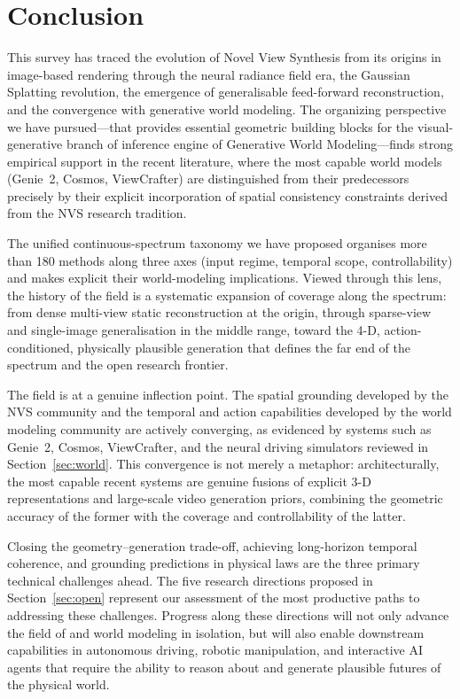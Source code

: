 \section{Conclusion}
\label{sec:conclusion}

This survey has traced the evolution of Novel View Synthesis from its origins
in image-based rendering through the neural radiance field era, the Gaussian
Splatting revolution, the emergence of generalisable feed-forward reconstruction,
and the convergence with generative world modeling.
The organizing perspective we have pursued---that \nvs{} provides essential geometric building blocks for the visual-generative branch of
inference engine of Generative World Modeling---finds strong empirical support
in the recent literature, where the most capable world models (Genie~2,
Cosmos, ViewCrafter) are distinguished from their predecessors precisely by
their explicit incorporation of spatial consistency constraints derived from
the NVS research tradition.

The unified continuous-spectrum taxonomy we have proposed organises more than
180 methods along three axes (input regime, temporal scope, controllability)
and makes explicit their world-modeling implications.
Viewed through this lens, the history of the field is a systematic expansion
of coverage along the spectrum: from dense multi-view static reconstruction
at the origin, through sparse-view and single-image generalisation in the
middle range, toward the 4-D, action-conditioned, physically plausible
generation that defines the far end of the spectrum and the open research frontier.

The field is at a genuine inflection point.
The spatial grounding developed by the NVS community and the temporal and
action capabilities developed by the world modeling community are actively
converging, as evidenced by systems such as Genie~2, Cosmos, ViewCrafter,
and the neural driving simulators reviewed in Section~\ref{sec:world}.
This convergence is not merely a metaphor: architecturally, the most capable
recent systems are genuine fusions of explicit 3-D representations and
large-scale video generation priors, combining the geometric accuracy of
the former with the coverage and controllability of the latter.

Closing the geometry--generation trade-off, achieving long-horizon temporal
coherence, and grounding predictions in physical laws are the three primary
technical challenges ahead.
The five research directions proposed in Section~\ref{sec:open} represent
our assessment of the most productive paths to addressing these challenges.
Progress along these directions will not only advance the field of \nvs{}
and world modeling in isolation, but will also enable downstream capabilities
in autonomous driving, robotic manipulation, and interactive AI agents that
require the ability to reason about and generate plausible futures of the
physical world.

